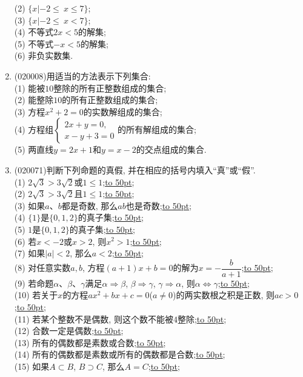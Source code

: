 \documentclass[10pt,a4paper]{article}
\newcommand{\blank}[1]{\underline{\hbox to #1pt{}}}
\begin{document}
\begin{enumerate}[1.]
(2) $\{x|-2\le\ x\le7\}$;\\
(3) $\{x|-2\le\ x<7\}$;\\
(4) 不等式$2x<5$的解集;\\
(5) 不等式$-x<5$的解集; \\
(6) 非负实数集.
\item {\tiny (020008)}用适当的方法表示下列集合:\\
(1) 能被$10$整除的所有正整数组成的集合;\\
(2) 能整除$10$的所有正整数组成的集合;\\
(3) 方程$x^2+2=0$的实数解组成的集合;\\
(4) 方程组$\begin{cases}2x+y=0, \\ x-y+3=0\end{cases}$的所有解组成的集合;\\
(5) 两直线$y=2x+1$和$y=x-2$的交点组成的集合.
\item {\tiny (020071)}判断下列命题的真假, 并在相应的括号内填入``真''或``假''.\\
(1) $2\sqrt 3>3\sqrt 2$或$1\le 1$;\blank{50};\\
(2) $2\sqrt 3>3\sqrt 2$且$1\le1$;\blank{50};\\
(3) 如果$a$、$b$都是奇数, 那么$ab$也是奇数;\blank{50};\\
(4) $\{1\}$是$\{0, 1, 2\}$的真子集;\blank{50};\\
(5) $1$是$\{0, 1, 2\}$的真子集;\blank{50};\\
(6) 若$x<-2$或$x>2$, 则$x^2>1$;\blank{50};\\
(7) 如果$|a|<2$, 那么$a<2$;\blank{50};\\
(8) 对任意实数$a,b$, 方程$(a+1)x+b=0$的解为$x=-\dfrac b{a+1}$;\blank{50};\\
(9) 若命题$\alpha$、$\beta$、$\gamma$满足$\alpha\Rightarrow \beta$, $\beta\Rightarrow \gamma$, $\gamma\Rightarrow \alpha$, 则$\alpha\Leftrightarrow \gamma$;\blank{50};\\
(10) 若关于$x$的方程$ax^2+bx+c=0$($a\ne 0$)的两实数根之积是正数, 则$ac>0$;\blank{50};\\
(11) 若某个整数不是偶数, 则这个数不能被$4$整除;\blank{50};\\
(12) 合数一定是偶数;\blank{50};\\
(13) 所有的偶数都是素数或合数;\blank{50};\\
(14) 所有的偶数都是素数或所有的偶数都是合数;\blank{50};\\
(15) 如果$A\subset B$, $B\supset C$, 那么$A=C$;\blank{50};\\

\end{enumerate}
\end{document}
